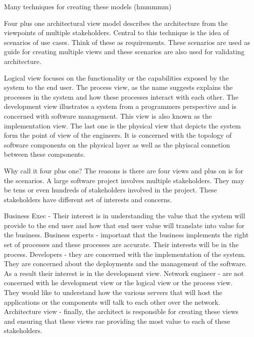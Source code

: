 \documentclass[a4paper, 11pt]{book}
\begin{document}
    Many techniques for creating these models (hmmmmm)

    Four plus one architectural view model describes the architecture from the viewpoints of multiple stakeholders.
    Central to this technique is the idea of scenarios of use cases. Think of these as requirements.
    These scenarios are used as guide for creating multiple views and these scenarios are also used for validating architecture.

    Logical view focuses on the functionality or the capabilities exposed by the system to the end user.
    The process view, as the name suggests explains the processes in the system and how these processes interact with each other.
    The development view illustrates a system from a programmers perspective and is concerned with software management. This view is also known as the implementation view.
    The last one is the physical view that depicts the system form the point of view of the engineers.
    It is concerned with the topology of software components on the physical layer as well as the phyiscal connetion between these components.


    Why call it four plus one?
    The reasons is there are four views and plus on is for the scenarios.
    A large software project involves multiple stakeholders.
    They may be tens or even hundreds of stakeholders involved in the project.
    These stakeholders have different set of interests and concerns.

    Business Exec - Their interest is in understanding the value that the system will provide to the end user and how that end user value will translate into value for the business.
    Business experts - important that the business implements the right set of processes and these processes are accurate. Their interests will be in the process.
    Developers - they are concerned with the implementation of the system.
    They are concerned about the deployments and the management of the software.
    As a result their interest is in the development view.
    Network engineer - are not concerned with he development view or the logical view or the process view.
    They would like to understand how the various servers that will host the applications or the components will talk to each other over the network.
    Architecture view - finally, the architect is responsible for creating these views and ensuring that these views rae providing the most value to each of these stakeholders.
\end{document}
